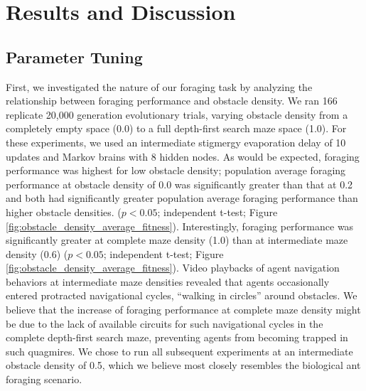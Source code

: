 \section{Results and Discussion}

\subsection{Parameter Tuning}




First, we investigated the nature of our foraging task by analyzing the relationship between foraging performance and obstacle density.
We ran 166 replicate 20,000 generation evolutionary trials, varying obstacle density from a completely empty space (0.0) to a full depth-first search maze space (1.0).
For these experiments, we used an intermediate stigmergy evaporation delay of 10 updates and Markov brains with 8 hidden nodes.
As would be expected, foraging performance was highest for low obstacle density;
population average foraging performance at obstacle density of 0.0 was significantly greater than that at 0.2 and both had significantly greater population average foraging performance than higher obstacle densities.
($p < 0.05$; independent t-test; Figure \ref{fig:obstacle_density_average_fitness}).
Interestingly, foraging performance was significantly greater at complete maze density (1.0) than at intermediate maze density (0.6) ($p < 0.05$; independent t-test; Figure \ref{fig:obstacle_density_average_fitness}).
Video playbacks of agent navigation behaviors at intermediate maze densities revealed that agents occasionally entered protracted navigational cycles, ``walking in circles'' around obstacles.
We believe that the increase of foraging performance at complete maze density might be due to the lack of available circuits for such navigational cycles in the complete depth-first search maze, preventing agents from becoming trapped in such quagmires.
We chose to run all subsequent experiments at an intermediate obstacle density of 0.5, which we believe most closely resembles the biological ant foraging scenario.

